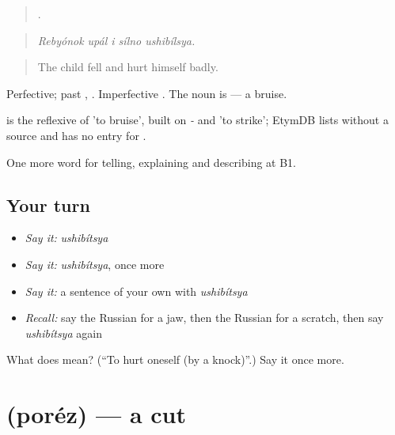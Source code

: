 \begin{quote}
    .
\end{quote}

\begin{quote}
\emph{Rebyónok upál i sílno ushibílsya.}
\end{quote}

\begin{quote}
The child fell and hurt himself badly.
\end{quote}

Perfective; past , . Imperfective . The noun is \emph{} — a bruise.

\begin{cousinweb}
\emph{} is the reflexive of \emph{} 'to bruise', built on \emph{-} and \emph{} 'to strike'; EtymDB lists \emph{} without a source and has no entry for \emph{}.
\end{cousinweb}

\begin{grammarlens}[title={What you've built}]
One more word for telling, explaining and describing at B1.
\end{grammarlens}

\subsection*{Your turn}
\begin{itemize}
\raggedright
  \item \emph{Say it:} \emph{ushibítsya}
  \item \emph{Say it:} \emph{ushibítsya}, once more
  \item \emph{Say it:} a sentence of your own with \emph{ushibítsya}
  \item \emph{Recall:} say the Russian for a jaw, then the Russian for a scratch, then say \emph{ushibítsya} again
\end{itemize}

\begin{tcolorbox}[breakable,colback=teal!4,colframe=teal!35!black,title={Before you move on}]
What does  mean? (\textquotedblleft{}To hurt oneself (by a knock)\textquotedblright{}.) Say it once more.
\end{tcolorbox}
\section[\texorpdfstring{\ru{порез} (poréz)}{порез (poréz)}]{ (poréz) — a cut}

